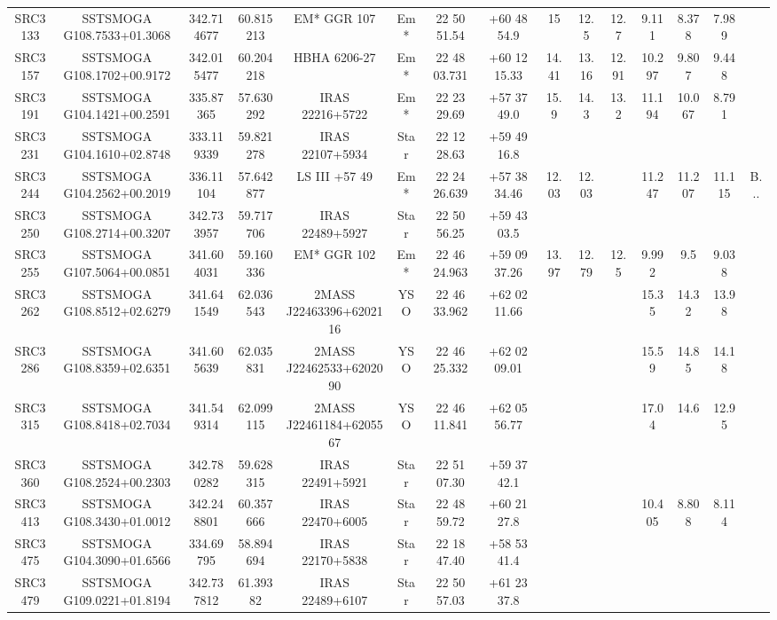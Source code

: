 \begin{table}
\begin{tabular}{ccccccccccccccc}
SRC3133 & SSTSMOGA G108.7533+01.3068 & 342.714677 & 60.815213 & EM* GGR  107 & Em* & 22 50 51.54 & +60 48 54.9 & 15 & 12.5 & 12.7 & 9.111 & 8.378 & 7.989 &  \\
SRC3157 & SSTSMOGA G108.1702+00.9172 & 342.015477 & 60.204218 & HBHA 6206-27 & Em* & 22 48 03.731 & +60 12 15.33 & 14.41 & 13.16 & 12.91 & 10.297 & 9.807 & 9.448 &  \\
SRC3191 & SSTSMOGA G104.1421+00.2591 & 335.87365 & 57.630292 & IRAS 22216+5722 & Em* & 22 23 29.69 & +57 37 49.0 & 15.9 & 14.3 & 13.2 & 11.194 & 10.067 & 8.791 &  \\
SRC3231 & SSTSMOGA G104.1610+02.8748 & 333.119339 & 59.821278 & IRAS 22107+5934 & Star & 22 12 28.63 & +59 49 16.8 &  &  &  &  &  &  &  \\
SRC3244 & SSTSMOGA G104.2562+00.2019 & 336.11104 & 57.642877 & LS III +57   49 & Em* & 22 24 26.639 & +57 38 34.46 & 12.03 & 12.03 &  & 11.247 & 11.207 & 11.115 & B... \\
SRC3250 & SSTSMOGA G108.2714+00.3207 & 342.733957 & 59.717706 & IRAS 22489+5927 & Star & 22 50 56.25 & +59 43 03.5 &  &  &  &  &  &  &  \\
SRC3255 & SSTSMOGA G107.5064+00.0851 & 341.604031 & 59.160336 & EM* GGR  102 & Em* & 22 46 24.963 & +59 09 37.26 & 13.97 & 12.79 & 12.5 & 9.992 & 9.5 & 9.038 &  \\
SRC3262 & SSTSMOGA G108.8512+02.6279 & 341.641549 & 62.036543 & 2MASS J22463396+6202116 & YSO & 22 46 33.962 & +62 02 11.66 &  &  &  & 15.35 & 14.32 & 13.98 &  \\
SRC3286 & SSTSMOGA G108.8359+02.6351 & 341.605639 & 62.035831 & 2MASS J22462533+6202090 & YSO & 22 46 25.332 & +62 02 09.01 &  &  &  & 15.59 & 14.85 & 14.18 &  \\
SRC3315 & SSTSMOGA G108.8418+02.7034 & 341.549314 & 62.099115 & 2MASS J22461184+6205567 & YSO & 22 46 11.841 & +62 05 56.77 &  &  &  & 17.04 & 14.6 & 12.95 &  \\
SRC3360 & SSTSMOGA G108.2524+00.2303 & 342.780282 & 59.628315 & IRAS 22491+5921 & Star & 22 51 07.30 & +59 37 42.1 &  &  &  &  &  &  &  \\
SRC3413 & SSTSMOGA G108.3430+01.0012 & 342.248801 & 60.357666 & IRAS 22470+6005 & Star & 22 48 59.72 & +60 21 27.8 &  &  &  & 10.405 & 8.808 & 8.114 &  \\
SRC3475 & SSTSMOGA G104.3090+01.6566 & 334.69795 & 58.894694 & IRAS 22170+5838 & Star & 22 18 47.40 & +58 53 41.4 &  &  &  &  &  &  &  \\
SRC3479 & SSTSMOGA G109.0221+01.8194 & 342.737812 & 61.39382 & IRAS 22489+6107 & Star & 22 50 57.03 & +61 23 37.8 &  &  &  &  &  &  &  \\

\end{tabular}
\end{table}
